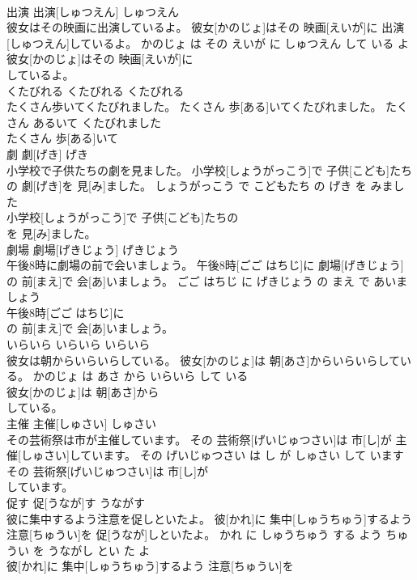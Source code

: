 \documentclass[8pt]{extreport}
\begin{document}
\begin{CJK}{UTF8}{min}
\\	出演	出演[しゅつえん]	しゅつえん	
\\	彼女はその映画に出演しているよ。	彼女[かのじょ]はその 映画[えいが]に 出演[しゅつえん]しているよ。	かのじょ は その えいが に しゅつえん して いる よ	
\\	彼女[かのじょ]はその 映画[えいが]に
\\	しているよ。			
\\	くたびれる	くたびれる	くたびれる	
\\	たくさん歩いてくたびれました。	たくさん 歩[ある]いてくたびれました。	たくさん あるいて くたびれました	
\\	たくさん 歩[ある]いて
\\	劇	劇[げき]	げき	
\\	小学校で子供たちの劇を見ました。	小学校[しょうがっこう]で 子供[こども]たちの 劇[げき]を 見[み]ました。	しょうがっこう で こどもたち の げき を みました	
\\	小学校[しょうがっこう]で 子供[こども]たちの
\\	を 見[み]ました。			
\\	劇場	劇場[げきじょう]	げきじょう	
\\	午後8時に劇場の前で会いましょう。	午後8時[ごご はちじ]に 劇場[げきじょう]の 前[まえ]で 会[あ]いましょう。	ごご はちじ に げきじょう の まえ で あいましょう	
\\	午後8時[ごご はちじ]に
\\	の 前[まえ]で 会[あ]いましょう。			
\\	いらいら	いらいら	いらいら	
\\	彼女は朝からいらいらしている。	彼女[かのじょ]は 朝[あさ]からいらいらしている。	かのじょ は あさ から いらいら して いる	
\\	彼女[かのじょ]は 朝[あさ]から
\\	している。			
\\	主催	主催[しゅさい]	しゅさい	
\\	その芸術祭は市が主催しています。	その 芸術祭[げいじゅつさい]は 市[し]が 主催[しゅさい]しています。	その げいじゅつさい は し が しゅさい して います	
\\	その 芸術祭[げいじゅつさい]は 市[し]が
\\	しています。			
\\	促す	促[うなが]す	うながす	
\\	彼に集中するよう注意を促しといたよ。	彼[かれ]に 集中[しゅうちゅう]するよう 注意[ちゅうい]を 促[うなが]しといたよ。	かれ に しゅうちゅう する よう ちゅうい を うながし とい た よ	
\\	彼[かれ]に 集中[しゅうちゅう]するよう 注意[ちゅうい]を

\end{CJK}
\end{document}
